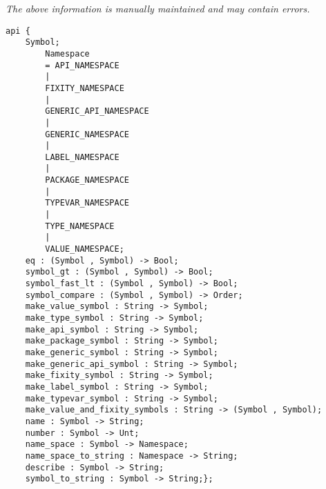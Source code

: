 \label{api:Symbol}

{\tiny \it The above information is manually maintained and may contain errors.}
\begin{verbatim}
api {
    Symbol;
        Namespace
        = API_NAMESPACE
        |
        FIXITY_NAMESPACE
        |
        GENERIC_API_NAMESPACE
        |
        GENERIC_NAMESPACE
        |
        LABEL_NAMESPACE
        |
        PACKAGE_NAMESPACE
        |
        TYPEVAR_NAMESPACE
        |
        TYPE_NAMESPACE
        |
        VALUE_NAMESPACE;
    eq : (Symbol , Symbol) -> Bool;
    symbol_gt : (Symbol , Symbol) -> Bool;
    symbol_fast_lt : (Symbol , Symbol) -> Bool;
    symbol_compare : (Symbol , Symbol) -> Order;
    make_value_symbol : String -> Symbol;
    make_type_symbol : String -> Symbol;
    make_api_symbol : String -> Symbol;
    make_package_symbol : String -> Symbol;
    make_generic_symbol : String -> Symbol;
    make_generic_api_symbol : String -> Symbol;
    make_fixity_symbol : String -> Symbol;
    make_label_symbol : String -> Symbol;
    make_typevar_symbol : String -> Symbol;
    make_value_and_fixity_symbols : String -> (Symbol , Symbol);
    name : Symbol -> String;
    number : Symbol -> Unt;
    name_space : Symbol -> Namespace;
    name_space_to_string : Namespace -> String;
    describe : Symbol -> String;
    symbol_to_string : Symbol -> String;};
\end{verbatim}
